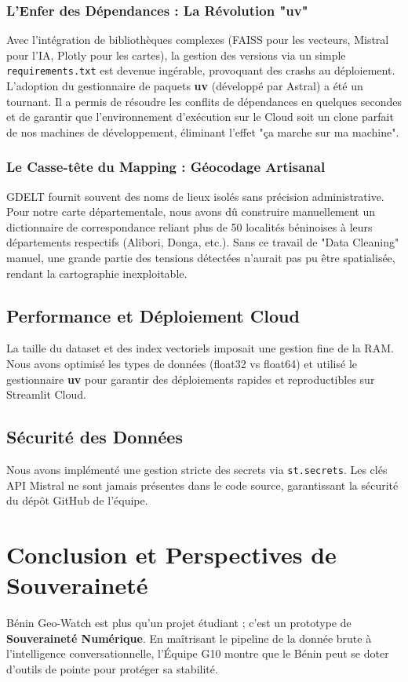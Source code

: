 \documentclass[12pt,a4paper]{article}
\begin{document}
\subsubsection{L'Enfer des Dépendances : La Révolution "uv"}
Avec l'intégration de bibliothèques complexes (FAISS pour les vecteurs, Mistral pour l'IA, Plotly pour les cartes), la gestion des versions via un simple \texttt{requirements.txt} est devenue ingérable, provoquant des crashs au déploiement. L'adoption du gestionnaire de paquets \textbf{uv} (développé par Astral) a été un tournant. Il a permis de résoudre les conflits de dépendances en quelques secondes et de garantir que l'environnement d'exécution sur le Cloud soit un clone parfait de nos machines de développement, éliminant l'effet "ça marche sur ma machine".

\subsubsection{Le Casse-tête du Mapping : Géocodage Artisanal}
GDELT fournit souvent des noms de lieux isolés sans précision administrative. Pour notre carte départementale, nous avons dû construire manuellement un dictionnaire de correspondance reliant plus de 50 localités béninoises à leurs départements respectifs (Alibori, Donga, etc.). Sans ce travail de "Data Cleaning" manuel, une grande partie des tensions détectées n'aurait pas pu être spatialisée, rendant la cartographie inexploitable.

\subsection{Performance et Déploiement Cloud}
La taille du dataset et des index vectoriels imposait une gestion fine de la RAM. Nous avons optimisé les types de données (float32 vs float64) et utilisé le gestionnaire \textbf{uv} pour garantir des déploiements rapides et reproductibles sur Streamlit Cloud.

\subsection{Sécurité des Données}
Nous avons implémenté une gestion stricte des secrets via \texttt{st.secrets}. Les clés API Mistral ne sont jamais présentes dans le code source, garantissant la sécurité du dépôt GitHub de l'équipe.

\section{Conclusion et Perspectives de Souveraineté}
Bénin Geo-Watch est plus qu'un projet étudiant ; c'est un prototype de \textbf{Souveraineté Numérique}. En maîtrisant le pipeline de la donnée brute à l'intelligence conversationnelle, l'Équipe G10 montre que le Bénin peut se doter d'outils de pointe pour protéger sa stabilité.
\end{document}
